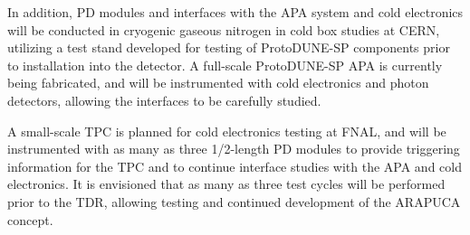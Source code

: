 
In addition, PD modules and interfaces with the APA system and cold electronics will be conducted in cryogenic gaseous nitrogen in cold box studies at CERN, utilizing a test stand developed for testing of ProtoDUNE-SP components prior to installation into the detector.  A full-scale ProtoDUNE-SP APA is currently being fabricated, and will be instrumented with cold electronics and photon detectors, allowing the interfaces to be carefully studied.

A small-scale TPC is planned for cold electronics testing at FNAL, and will be instrumented with as many as three 1/2-length PD modules to provide triggering information for the TPC and to continue interface studies with the APA and cold electronics.  It is envisioned that as many as three test cycles will be performed prior to the TDR, allowing testing and continued development of the ARAPUCA concept.




